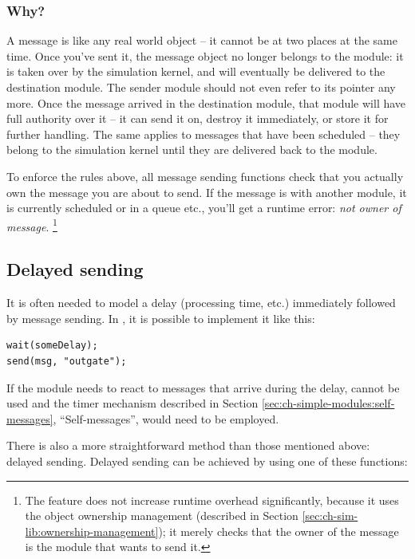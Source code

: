 \subsubsection{Why?}

A message is like any real world object -- it cannot be at two places
at the same time. Once you've sent it, the message object
no longer belongs to the module: it is taken over by the simulation kernel,
and will eventually be delivered to the destination module.
The sender module should not even refer to its pointer any more.
Once the message arrived in the destination module, that module
will have full authority over it -- it can send it on,
destroy it immediately, or store it for further handling.
The same applies to messages that have been scheduled -- they
belong to the simulation kernel until they are delivered back to
the module.

To enforce the rules above, all message sending functions
check that you actually own the message you are about to send.
If the message is with another module, it is currently scheduled or
in a queue etc., you'll get a runtime error: \textit{not owner of message}.
  \footnote{The feature does not increase runtime overhead significantly, because
  it uses the object ownership management (described in
  Section \ref{sec:ch-sim-lib:ownership-management});
  it merely checks that the owner of the message is the module that
  wants to send it.}



\subsection{Delayed sending}
\label{sec:simple-modules:delayed-sending}

It is often needed to model a delay (processing time, etc.) immediately
followed by message sending. In {\opp}, it is possible to implement
it like this:

\begin{verbatim}
wait(someDelay);
send(msg, "outgate");
\end{verbatim}


If the module needs to react to messages that arrive during the delay,
 cannot be used and the timer mechanism described in
Section \ref{sec:ch-simple-modules:self-messages}, ``Self-messages'', would
need to be employed.


There is also a more straightforward method than those mentioned above:
delayed sending. Delayed sending can be achieved
by using one of these functions:

